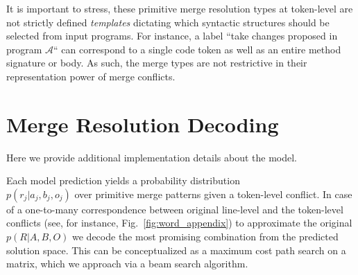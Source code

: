 It is important to stress, these primitive merge resolution types at token-level are not strictly defined \textit{templates} dictating which syntactic structures should be selected from input programs. For instance, a label ``take changes proposed in program $\mathcal{A}$`` can correspond to a single code token as well as an entire method signature or body. As such, the merge types are not restrictive in their representation power of merge conflicts.


\section{Merge Resolution Decoding}
\label{sec:decoding}

Here we provide additional implementation details about the model.

Each model prediction yields a probability distribution \\ $p(r_{j} | a_{j}, b_{j}, o_{j})$ over primitive merge patterns given a token-level conflict. In case of a one-to-many correspondence between original line-level and the token-level conflicts (see, for instance, Fig.~\ref{fig:word_appendix}) to approximate the original $p(R | A, B, O)$ we decode the most promising combination from the predicted solution space. This can be conceptualized as a maximum cost path search on a matrix, which we approach via a beam search algorithm.

